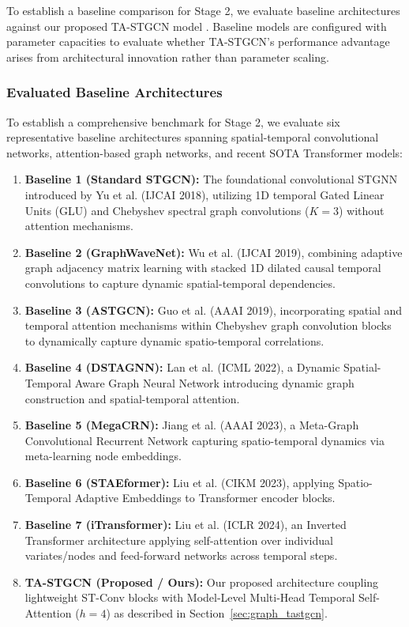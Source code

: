 \documentclass[journal,twocolumn]{IEEEtran}
\begin{document}
To establish a baseline comparison for Stage 2, we evaluate baseline architectures against our proposed TA-STGCN model \cite{stgcn, attention}. Baseline models are configured with parameter capacities to evaluate whether TA-STGCN's performance advantage arises from architectural innovation rather than parameter scaling.

\subsubsection{Evaluated Baseline Architectures}
To establish a comprehensive benchmark for Stage 2, we evaluate six representative baseline architectures spanning spatial-temporal convolutional networks, attention-based graph networks, and recent SOTA Transformer models:
\begin{enumerate}
    \item \textbf{Baseline 1 (Standard STGCN):} The foundational convolutional STGNN introduced by Yu et al. \cite{stgcn} (IJCAI 2018), utilizing 1D temporal Gated Linear Units (GLU) and Chebyshev spectral graph convolutions ($K=3$) \cite{chebnet} without attention mechanisms.
    \item \textbf{Baseline 2 (GraphWaveNet):} Wu et al. \cite{wavenet} (IJCAI 2019), combining adaptive graph adjacency matrix learning with stacked 1D dilated causal temporal convolutions to capture dynamic spatial-temporal dependencies.
    \item \textbf{Baseline 3 (ASTGCN):} Guo et al. \cite{astgcn} (AAAI 2019), incorporating spatial and temporal attention mechanisms within Chebyshev graph convolution blocks to dynamically capture dynamic spatio-temporal correlations.
    \item \textbf{Baseline 4 (DSTAGNN):} Lan et al. \cite{dstagnn} (ICML 2022), a Dynamic Spatial-Temporal Aware Graph Neural Network introducing dynamic graph construction and spatial-temporal attention.
    \item \textbf{Baseline 5 (MegaCRN):} Jiang et al. \cite{megacrn} (AAAI 2023), a Meta-Graph Convolutional Recurrent Network capturing spatio-temporal dynamics via meta-learning node embeddings.
    \item \textbf{Baseline 6 (STAEformer):} Liu et al. \cite{staeformer} (CIKM 2023), applying Spatio-Temporal Adaptive Embeddings to Transformer encoder blocks.
    \item \textbf{Baseline 7 (iTransformer):} Liu et al. \cite{itransformer} (ICLR 2024), an Inverted Transformer architecture applying self-attention over individual variates/nodes and feed-forward networks across temporal steps.
    \item \textbf{TA-STGCN (Proposed / Ours):} Our proposed architecture coupling lightweight ST-Conv blocks \cite{stgcn} with Model-Level Multi-Head Temporal Self-Attention ($h=4$) \cite{attention} as described in Section~\ref{sec:graph_tastgcn}.
\end{enumerate}
\end{document}
